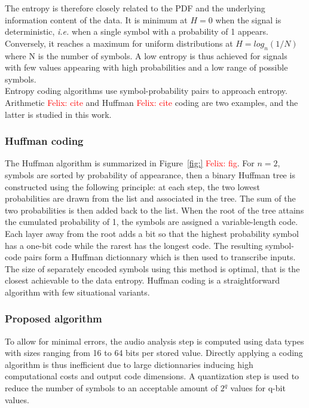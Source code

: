 \documentclass[12pt,times,onecolumn]{article}
\newcommand{\fg}[1]{\textcolor{red}{ Felix: #1}}
\begin{document}
The entropy is therefore closely related to the PDF and the underlying information content of the data. It is minimum at $H = 0$ when the signal is deterministic, \textit{i.e.} when a single symbol with a probability of 1 appears. Conversely, it reaches a maximum for uniform distributions at $H = log_n(1/N)$ where N is the number of symbols. A low entropy is thus achieved for signals with few values appearing with high probabilities and a low range of possible symbols.\\

Entropy coding algorithms use symbol-probability pairs to approach entropy. Arithmetic \fg{cite} and Huffman \fg{cite} coding are two examples, and the latter is studied in this work.

\subsubsection{Huffman coding}
The Huffman algorithm is summarized in Figure~\ref{fig:}\fg{fig}. For $n = 2$, symbols are sorted by probability of appearance, then a binary Huffman tree is constructed using the following principle: at each step, the two lowest probabilities are drawn from the list and associated in the tree. The sum of the two probabilities is then added back to the list. When the root of the tree attains the cumulated probability of 1, the symbols are assigned a variable-length code. Each layer away from the root adds a bit so that the highest probability symbol has a one-bit code while the rarest has the longest code. The resulting symbol-code pairs form a Huffman dictionnary which is then used to transcribe inputs. The size of separately encoded symbols using this method is optimal, that is the closest achievable to the data entropy. Huffman coding is a straightforward algorithm with few situational variants.

\subsubsection{Proposed algorithm}
To allow for minimal errors, the audio analysis step is computed using data types with sizes ranging from 16 to 64 bits per stored value. Directly applying a coding algorithm is thus inefficient due to large dictionnaries inducing high computational costs and output code dimensions. A quantization step is used to reduce the number of symbols to an acceptable amount of $2^q$ values for q-bit values.\\
\end{document}
